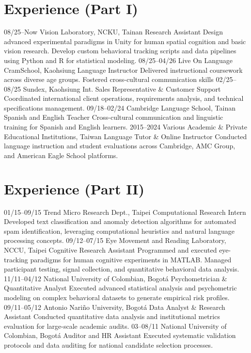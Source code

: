 \documentclass[]{friggeri-cv}
\begin{document}
\section{Experience (Part I)}
\begin{entrylist}
    \entry
    {08/25–Now}
    {Vision Laboratory, NCKU, Tainan}
    {Research Assistant}
    {Design advanced experimental paradigms in Unity for human spatial cognition and basic vision research. Develop custom behavioral tracking scripts and data pipelines using Python and R for statistical modeling.}
  \entry
    {08/25–04/26}
    {Live On Language CramSchool, Kaohsiung}
    {Language Instructor}
    {Delivered instructional coursework across diverse age groups. Fostered cross-cultural communication skills}
  \entry
    {02/25–08/25}
    {Sundex, Kaohsiung}
    {Int. Sales Representative \& Customer Support}
    {Coordinated international client operations, requirements analysis, and technical specifications management.}
  \entry
    {09/18–02/24}
    {Cambridge Language School, Tainan}
    {Spanish and English Teacher}
    {Cross-cultural communication and linguistic training for Spanish and English learners.}
  \entry
    {2015–2024}
    {Various Academic \& Private Educational Institutions, Taiwan}
    {Language Tutor \& Online Instructor}
    {Conducted language instruction and student evaluations across Cambridge, AMC Group, and American Eagle School platforms.}
\end{entrylist}

\newpage

\section{Experience (Part II)}
\begin{entrylist}
  \entry
    {01/15–09/15}
    {Trend Micro Research Dept., Taipei}
    {Computational Research Intern}
    {Developed text classification and anomaly detection algorithms for automated spam identification, leveraging computational heuristics and natural language processing concepts.}
  \entry
    {09/12–07/15}
    {Eye Movement and Reading Laboratory, NCCU, Taipei}
    {Cognitive Research Assistant}
    {Programmed and executed eye-tracking paradigms for human cognitive experiments in MATLAB. Managed participant testing, signal collection, and quantitative behavioral data analysis.}
  \entry
    {11/11–04/12}
    {National University of Colombian, Bogotá}
    {Psychometrician \& Quantitative Analyst}
    {Executed advanced statistical analysis and psychometric modeling on complex behavioral datasets to generate empirical risk profiles.}
  \entry
    {09/11–05/12}
    {Antonio Nariño University, Bogotá}
    {Data Analyst \& Research Assistant}
    {Conducted quantitative data analysis and institutional metrics evaluation for large-scale academic audits.}
  \entry
    {03–08/11}
    {National University of Colombian, Bogotá}
    {Auditor and HR Assistant}
    {Executed systematic validation protocols and data auditing for national candidate selection processes.}
\end{entrylist}
\end{document}
